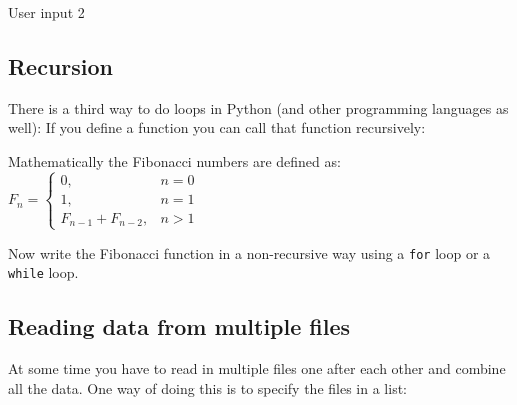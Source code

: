 \ifanswers
\begin{tcolorbox}[enhanced jigsaw,breakable,pad at break*=1mm,
    colback=blue!5!white,colframe=babyblueeyes,title=Solutions,
    watermark color=white]
    User input 2
    
\end{tcolorbox}
\fi

\subsection{Recursion}

There is a third way to do loops in Python (and other programming languages as well):
If you define a function you can call that function recursively: \\

\begin{tcolorbox}[enhanced jigsaw,breakable,pad at break*=1mm,
    colback=blue!5!white,colframe=babyblueeyes,title=Recursion with Fibonacci,
    watermark color=white]
    
\end{tcolorbox}

Mathematically the Fibonacci numbers are defined as: \\

\begin{math}
    F_{n} = \left\{
        \begin{array}{ll}
            0, & n = 0 \\
            1, & n = 1 \\
            F_{n-1} + F_{n-2}, & n > 1
        \end{array}
    \right.
\end{math}

Now write the Fibonacci function in a non-recursive way using a \verb|for| loop or a \verb|while| loop. \\

\ifanswers
\begin{tcolorbox}[enhanced jigsaw,breakable,pad at break*=1mm,
    colback=blue!5!white,colframe=babyblueeyes,title=Solutions,
    watermark color=white]
    
\end{tcolorbox}
\fi

\subsection{Reading data from multiple files}
At some time you have to read in multiple files one after each other and combine all the data.
One way of doing this is to specify the files in a list: \\

